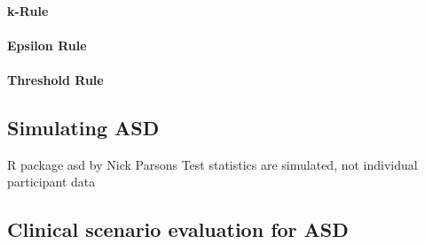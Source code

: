 \documentclass[bimj,fleqn]{w-art}
\theoremstyle{plain}
\theoremstyle{definition}
\begin{document}
\paragraph{k-Rule} %

\paragraph{Epsilon Rule}

\paragraph{Threshold Rule}

\subsection{Simulating ASD}
\label{ssec:simulating_asd}
R package asd by Nick Parsons
Test statistics are simulated, not individual participant data


\subsection{Clinical scenario evaluation for ASD}
\label{ssec:clinical_scenario_evaluation_for_asd}
\end{document}
